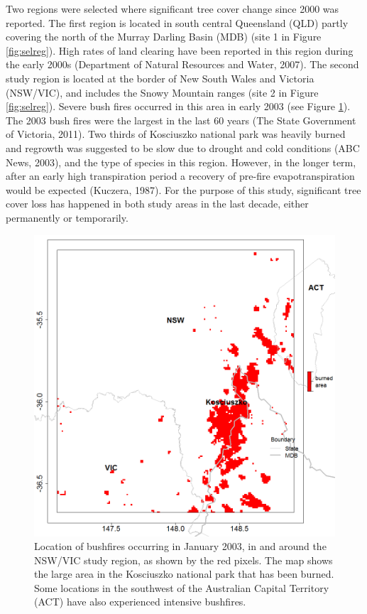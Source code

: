 \documentclass[fleqn,10pt,lineno]{wlpeerj} %
\theoremstyle{definition}
\theoremstyle{definition}
\theoremstyle{definition}
\theoremstyle{remark}
\begin{document}
Two regions were selected where significant tree cover change since 2000
was reported. The first region is located in south central Queensland
(QLD) partly covering the north of the Murray Darling Basin (MDB) (site
1 in Figure \ref{fig:selreg}). High rates of land clearing have been
reported in this region during the early 2000s (Department of Natural
Resources and Water, 2007). The second study region is located at the
border of New South Wales and Victoria (NSW/VIC), and includes the Snowy
Mountain ranges (site 2 in Figure \ref{fig:selreg}). Severe bush fires
occurred in this area in early 2003 (see Figure \ref{fig:bushfire}). The
2003 bush fires were the largest in the last 60 years (The State
Government of Victoria, 2011). Two thirds of Kosciuszko national park
was heavily burned and regrowth was suggested to be slow due to drought
and cold conditions (ABC News, 2003), and the type of species in this
region. However, in the longer term, after an early high transpiration
period a recovery of pre-fire evapotranspiration would be expected
(Kuczera, 1987). For the purpose of this study, significant tree cover
loss has happened in both study areas in the last decade, either
permanently or temporarily.

\begin{figure}
\includegraphics[width=0.9\linewidth]{figures/bushfire_nswvic} \caption{Location of bushfires occurring in January 2003, in and around the NSW/VIC study region, as shown by the red pixels. The map shows the large area in the Kosciuszko national park that has been burned. Some locations in the southwest of the Australian Capital Territory (ACT) have also experienced intensive bushfires.}\label{fig:bushfire}
\end{figure}
\end{document}

